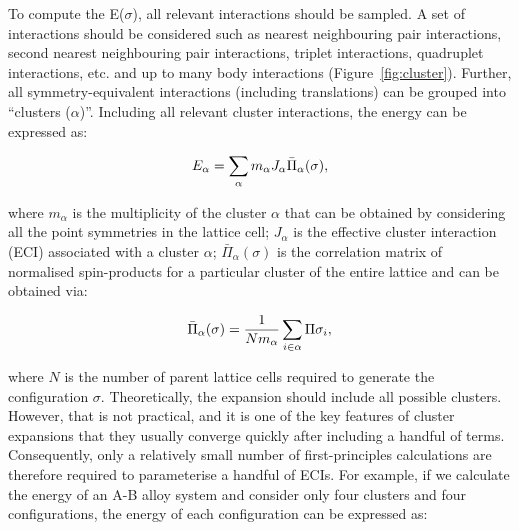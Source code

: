 \documentclass[../main.tex]{subfiles}
\begin{document}
To compute the E($\sigma$), all relevant interactions should be sampled. A set of interactions should be considered such as nearest neighbouring pair interactions, second nearest neighbouring pair interactions, triplet interactions, quadruplet interactions, etc. and up to many body interactions (Figure~\ref{fig:cluster}). Further, all symmetry-equivalent interactions (including translations) can be grouped into ``clusters ($\alpha$)''. Including all relevant cluster interactions, the energy can be expressed as:

\begin{equation}
    \centering
    {E}_{\alpha}=\sum_\alpha {m_\alpha}{J_\alpha}{\bar{\Pi}_\alpha(\sigma)},
    \label{eq:clusters}
\end{equation} 

where $m_\alpha$ is the multiplicity of the cluster $\alpha$ that can be obtained by considering all the point symmetries in the lattice cell; $J_\alpha$ is the effective cluster interaction (ECI) associated with a cluster $\alpha$; $\bar{\Pi}_\alpha(\sigma)$ is the correlation matrix of normalised spin-products for a particular cluster of the entire lattice and can be obtained via:

\begin{equation}
    \centering
    {\bar{\Pi}_\alpha(\sigma)}=\frac{1}{N{m_\alpha}}\sum_{i\in\alpha} {\Pi{\sigma_i}},
    \label{eq:correlation_matrix}
\end{equation} 

where $N$ is the number of parent lattice cells required to generate the configuration $\sigma$. Theoretically, the expansion should include all possible clusters. However, that is not practical, and it is one of the key features of cluster expansions that they usually converge quickly after including a handful of terms.\cite{VanderVen2001} Consequently, only a relatively small number of first-principles calculations are therefore required to parameterise a handful of ECIs. For example, if we calculate the energy of an A-B alloy system and consider only four clusters and four configurations, the energy of each configuration can be expressed as:
\end{document}

